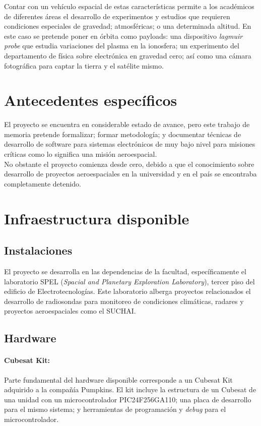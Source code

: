 \documentclass[11pt,letterpaper]{article}
\begin{document}
Contar con un vehículo espacial de estas características permite a los académicos de diferentes áreas el desarrollo de experimentos y estudios que requieren condiciones especiales de gravedad; atmosféricas; o una determinada altitud. En este caso se pretende poner en órbita como payloads: una dispositivo \textit{lagmuir probe} que estudia variaciones del plasma en la ionosfera; un experimento del departamento de física sobre electrónica en gravedad cero; así como una cámara fotográfica para captar la tierra y el satélite mismo. 

\section{Antecedentes específicos}

El proyecto se encuentra en considerable estado de avance, pero este trabajo de memoria pretende formalizar; formar metodología; y documentar técnicas de desarrollo de software para sistemas electrónicos de muy bajo nivel para misiones críticas como lo significa una misión aeroespacial.\\

No obstante el proyecto comienza desde cero, debido a que el conocimiento sobre desarrollo de proyectos aeroespaciales en la universidad y en el país se encontraba completamente detenido.

\newpage
\section{Infraestructura disponible}
\subsection{Instalaciones}
El proyecto se desarrolla en las dependencias de la facultad, específicamente el laboratorio SPEL (\textit{Spacial and Planetary Exploration Laboratory}), tercer piso del edificio de Electrotecnologías. Este laboratorio alberga proyectos relacionados el desarrollo de radiosondas para monitoreo de condiciones climáticas, radares y proyectos aeroespaciales como el SUCHAI.

\subsection{Hardware}
\paragraph{Cubesat Kit:}
Parte fundamental del hardware disponible corresponde a un Cubesat Kit adquirido a la compañía Pumpkins. El kit incluye la estructura de un Cubesat de una unidad con un microcontrolador PIC24F256GA110; una placa de desarrollo para el mismo sistema; y herramientas de programación y \textit{debug} para el microcontrolador.
\end{document}
